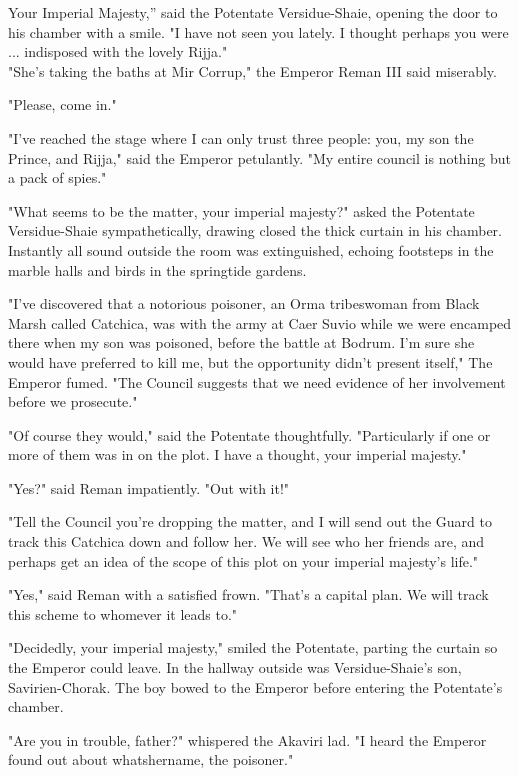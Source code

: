 \clearpage
{}

\dropcap Your Imperial Majesty,'' said the Potentate Versidue-Shaie, opening the door to his chamber with a smile. "I have not seen you lately. I thought perhaps you were ... indisposed with the lovely Rijja."\\"She's taking the baths at Mir Corrup," the Emperor Reman III said miserably.

"Please, come in."

"I've reached the stage where I can only trust three people: you, my son the Prince, and Rijja," said the Emperor petulantly. "My entire council is nothing but a pack of spies."

"What seems to be the matter, your imperial majesty?" asked the Potentate Versidue-Shaie sympathetically, drawing closed the thick curtain in his chamber. Instantly all sound outside the room was extinguished, echoing footsteps in the marble halls and birds in the springtide gardens.

"I've discovered that a notorious poisoner, an Orma tribeswoman from Black Marsh called Catchica, was with the army at Caer Suvio while we were encamped there when my son was poisoned, before the battle at Bodrum. I'm sure she would have preferred to kill me, but the opportunity didn't present itself," The Emperor fumed. "The Council suggests that we need evidence of her involvement before we prosecute."

"Of course they would," said the Potentate thoughtfully. "Particularly if one or more of them was in on the plot. I have a thought, your imperial majesty."

"Yes?" said Reman impatiently. "Out with it!"

"Tell the Council you're dropping the matter, and I will send out the Guard to track this Catchica down and follow her. We will see who her friends are, and perhaps get an idea of the scope of this plot on your imperial majesty's life."

"Yes," said Reman with a satisfied frown. "That's a capital plan. We will track this scheme to whomever it leads to."

"Decidedly, your imperial majesty," smiled the Potentate, parting the curtain so the Emperor could leave. In the hallway outside was Versidue-Shaie's son, Savirien-Chorak. The boy bowed to the Emperor before entering the Potentate's chamber.

"Are you in trouble, father?" whispered the Akaviri lad. "I heard the Emperor found out about whatshername, the poisoner."

